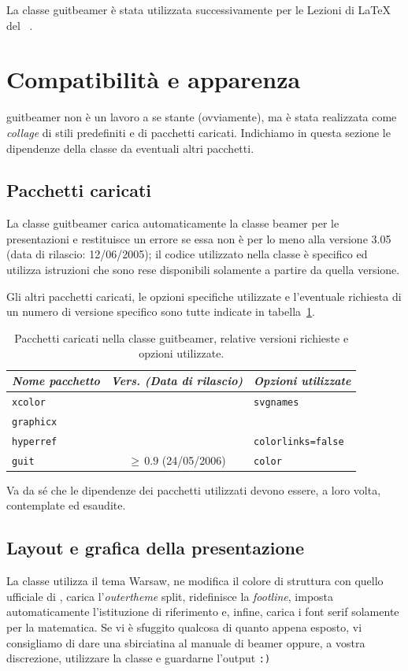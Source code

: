 \documentclass[a4paper,10pt]{article}
\newcommand{\lcap}{{\fontencoding{T1}\selectfont\guillemotleft}}
\newcommand{\rcap}{{\fontencoding{T1}\selectfont\guillemotright}}
\newcommand{\Cap}[1]{\lcap #1\rcap}
\newcommand{\pkg}[1]{\textsf{#1}}
\let\cls\pkg
\begin{document}
La classe \cls{guitbeamer} è stata utilizzata successivamente per le 
\Cap{Lezioni di \LaTeX} del \GuIT\ \cite{lez-latex05}.

\section{Compatibilità e apparenza}
\cls{guitbeamer} non è un lavoro a se stante (ovviamente), ma è stata
realizzata come \textit{collage} di stili predefiniti e di pacchetti
caricati. Indichiamo in questa sezione le dipendenze della classe da
eventuali altri pacchetti.

\subsection{Pacchetti caricati}
La classe \cls{guitbeamer} carica automaticamente la classe
\cls{beamer} per le presentazioni e restituisce un errore se essa non
è per lo meno alla versione 3.05 (data di rilascio: 12/06/2005); il
codice utilizzato nella classe è specifico ed utilizza istruzioni che
sono rese disponibili solamente a partire da quella versione.

Gli altri pacchetti caricati, le opzioni specifiche utilizzate e
l'eventuale richiesta di un numero di versione specifico sono tutte
indicate in tabella~\ref{pacchetti}.
\begin{table}[b]\centering
  \caption{Pacchetti caricati nella classe \cls{guitbeamer}, relative
  versioni richieste e opzioni utilizzate.}\label{pacchetti}
  \medskip
  \begin{tabular}{l c l}
    \toprule
    \emph{Nome pacchetto} & \emph{Vers. (Data di rilascio)} &
    \emph{Opzioni utilizzate}\\
    \midrule
    \texttt{xcolor} & & \texttt{svgnames}\\
    \texttt{graphicx} & &\\
    \texttt{hyperref} & & \texttt{colorlinks=false}\\
    \texttt{guit} & $\ge\,0.9$ (24/05/2006)& \texttt{color}\\
    \bottomrule
  \end{tabular}
\end{table}
Va da sé che le dipendenze dei pacchetti utilizzati devono essere, a
loro volta, contemplate ed esaudite.

\subsection{Layout e grafica della presentazione}
La classe utilizza il tema \Cap{Warsaw}, ne modifica il colore di
struttura con quello ufficiale di \GuIT, carica l'\textit{outertheme}
\Cap{split}, ridefinisce la \textit{footline}, imposta automaticamente
l'istituzione di riferimento e, infine, carica i font serif solamente
per la matematica. Se vi è sfuggito qualcosa di quanto appena esposto,
vi consigliamo di dare una sbirciatina al manuale di \cls{beamer}
\cite{manbeamer} oppure, a vostra discrezione, utilizzare la
classe e guardarne l'output \texttt{:)}
\end{document}
